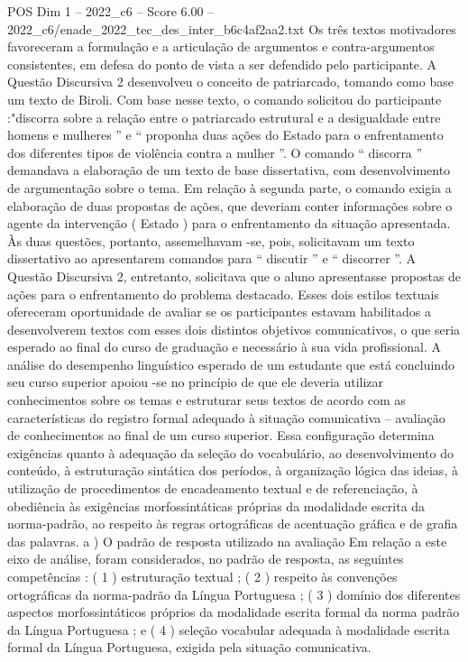 \begin{textsample}{POS Dim 1 – 2022\_c6 – Score 6.00 – 2022\_c6/enade\_2022\_tec\_des\_inter\_b6c4af2aa2.txt}
Os três textos motivadores favoreceram a formulação e a articulação de argumentos e contra-argumentos consistentes, em defesa do ponto de vista a ser defendido pelo participante.
A Questão Discursiva 2 desenvolveu o conceito de patriarcado, tomando como base um texto de Biroli.
Com base nesse texto, o comando solicitou do participante :"discorra sobre a relação entre o patriarcado estrutural e a desigualdade entre homens e mulheres ” e “ proponha duas ações do Estado para o enfrentamento dos diferentes tipos de violência contra a mulher ”.
O comando “ discorra ” demandava a elaboração de um texto de base dissertativa, com desenvolvimento de argumentação sobre o tema.
Em relação à segunda parte, o comando exigia a elaboração de duas propostas de ações, que deveriam conter informações sobre o agente da intervenção ( Estado ) para o enfrentamento da situação apresentada.
Às duas questões, portanto, assemelhavam -se, pois, solicitavam um texto dissertativo ao apresentarem comandos para “ discutir ” e “ discorrer ”.
A Questão Discursiva 2, entretanto, solicitava que o aluno apresentasse propostas de ações para o enfrentamento do problema destacado.
Esses dois estilos textuais ofereceram oportunidade de avaliar se os participantes estavam habilitados a desenvolverem textos com esses dois distintos objetivos comunicativos, o que seria esperado ao final do curso de graduação e necessário à sua vida profissional.
A análise do desempenho linguístico esperado de um estudante que está concluindo seu curso superior apoiou -se no princípio de que ele deveria utilizar conhecimentos sobre os temas e estruturar seus textos de acordo com as características do registro formal adequado à situação comunicativa – avaliação de conhecimentos ao final de um curso superior.
Essa configuração determina exigências quanto à adequação da seleção do vocabulário, ao desenvolvimento do conteúdo, à estruturação sintática dos períodos, à organização lógica das ideias, à utilização de procedimentos de encadeamento textual e de referenciação, à obediência às exigências morfossintáticas próprias da modalidade escrita da norma-padrão, ao respeito às regras ortográficas de acentuação gráfica e de grafia das palavras. a ) O padrão de resposta utilizado na avaliação Em relação a este eixo de análise, foram considerados, no padrão de resposta, as seguintes competências : ( 1 ) estruturação textual ; ( 2 ) respeito às convenções ortográficas da norma-padrão da Língua Portuguesa ; ( 3 ) domínio dos diferentes aspectos morfossintáticos próprios da modalidade escrita formal da norma padrão da Língua Portuguesa ; e ( 4 ) seleção vocabular adequada à modalidade escrita formal da Língua Portuguesa, exigida pela situação comunicativa.

\end{textsample}
